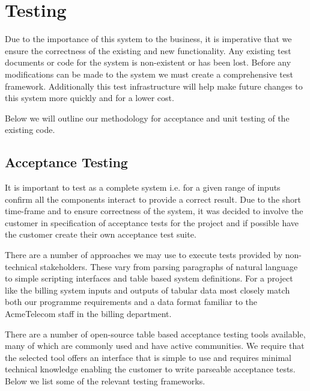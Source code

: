\section{Testing}
Due to the importance of this system to the business, it is imperative that we ensure the correctness of the existing and new functionality. Any existing test documents or code for the system is non-existent or has been lost. Before any modifications can be made to the system we must create a comprehensive test framework. Additionally this test infrastructure will help make future changes to this system more quickly and for a lower cost.

Below we will outline our methodology for acceptance and unit testing of the existing code.

\subsection{Acceptance Testing}
It is important to test as a complete system i.e. for a given range of inputs confirm all the components interact to provide a correct result. Due to the short time-frame and to ensure correctness of the system, it was decided to involve the customer in specification of acceptance tests for the project and if possible have the customer create their own acceptance test suite. 

There are a number of approaches we may use to execute tests provided by non-technical stakeholders. These vary from parsing paragraphs of natural language to simple scripting interfaces and table based system definitions. For a project like the billing system inputs and outputs of tabular data most closely match both our programme requirements and a data format familiar to the AcmeTelecom staff in the billing department.

There are a number of open-source table based acceptance testing tools available, many of which are commonly used and have active communities. We require that the selected tool offers an interface that is simple to use and requires minimal technical knowledge enabling the customer to write parseable acceptance tests. Below we list some of the relevant testing frameworks.


